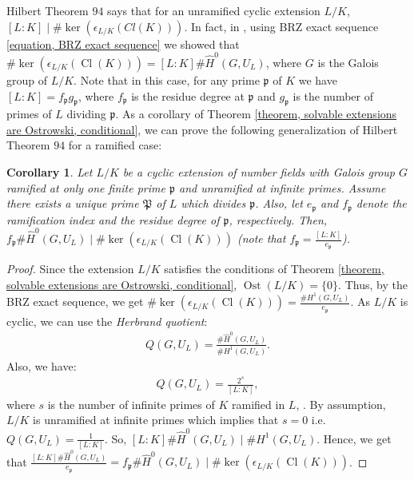 \documentclass{amsart}
\newtheorem{corollary}[theorem]{Corollary}
\theoremstyle{definition}
\numberwithin{equation}{section}
\DeclareMathOperator{\Ost}{Ost}
\DeclareMathOperator{\Cl}{Cl}
\begin{document}
Hilbert Theorem $94$ says that for an unramified cyclic extension $L/K$, $[L:K] \mid \#\ker(\epsilon_{L/K}(Cl(K)))$. In fact, in \cite{SRM}, using BRZ exact sequence \eqref{equation, BRZ exact sequence} we showed that $\#\ker(\epsilon_{L/K}(\Cl(K)))=[L:K] \# \hat{H}^0(G,U_L)$, where $G$ is the Galois group of $L/K$. Note that in this case, for any prime $\mathfrak{p}$ of $K$ we have $[L:K]=f_{\mathfrak{p}}g_{\mathfrak{p}}$, where $f_{\mathfrak{p}}$ is the residue degree at $\mathfrak{p}$ and  $g_{\mathfrak{p}}$ is the number of primes of $L$ dividing $\mathfrak{p}$. As a corollary of Theorem \ref{theorem, solvable extensions are Ostrowski, conditional}, we can prove the following generalization of Hilbert Theorem $94$ for a ramified case:

\begin{corollary}
Let $L/K$ be a cyclic extension of number fields with Galois group $G$ ramified at only one finite prime $\mathfrak{p}$ and unramified at infinite primes. Assume there exists a unique prime $\mathfrak{P}$ of $L$ which divides $\mathfrak{p}$. Also, let $e_{\mathfrak{p}}$ and $f_{\mathfrak{p}}$ denote the ramification index and the residue degree of $\mathfrak{p}$, respectively. Then, $f_{\mathfrak{p}}  \#\hat{H}^0(G,U_L) \mid \#\ker(\epsilon_{L/K}(\Cl(K)))$ (note that $f_{\mathfrak{p}} =\frac{[L:K]}{e_{\mathfrak{p}}}$).
\end{corollary}
 
\begin{proof}
Since the extension $L/K$ satisfies the conditions of Theorem \ref{theorem, solvable extensions are Ostrowski, conditional}, $\Ost(L/K)=\{0\}$. Thus, by the BRZ exact sequence, we get $\#\ker(\epsilon_{L/K}(\Cl(K)))=\frac{\#H^1(G,U_L)}{e_{\mathfrak{p}}}$. As $L/K$ is cyclic, we can use the \textit{Herbrand quotient}:
\begin{align*} \label{equation, Herbrand quotients of L over K}
Q(G,U_L)=\frac{\# \hat{H}^0(G, U_L)}{\#{H}^1(G,U_L)}.
\end{align*}
Also, we have:
\begin{align*}
Q(G,U_L)= \frac{2^s}{[L:K]},
\end{align*}
where $s$ is the number of infinite primes of $K$ ramified in $L$, \cite[IX,\S4,Corollary 2]{Lang}. By assumption, $L/K$ is unramified at infinite primes which implies that $s=0$ i.e. $Q(G,U_L)=\frac{1}{[L:K]}$. So, $[L:K] \#\hat{H}^0(G,U_L) \mid \#H^1(G,U_L)$. Hence, we get that $\frac{[L:K] \#\hat{H}^0(G,U_L)}{e_{\mathfrak{p}}} = f_{\mathfrak{p}} \#\hat{H}^0(G,U_L) \mid \#\ker(\epsilon_{L/K}(\Cl(K)))$.
\end{proof}
\end{document}
